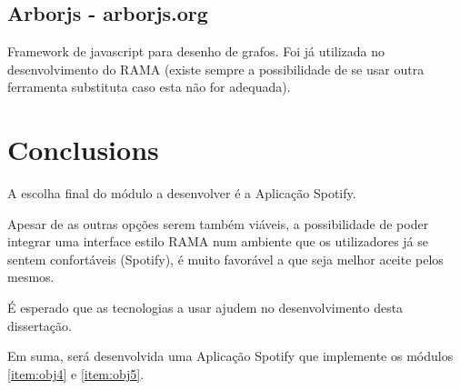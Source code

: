   \subsection{Arborjs - arborjs.org} %
  \label{sub:arborjs}
    Framework de javascript para desenho de grafos. Foi já utilizada no desenvolvimento do RAMA (existe sempre a possibilidade de se usar outra ferramenta substituta caso esta não for adequada).
  


\section{Conclusions}

  A escolha final do módulo a desenvolver é a Aplicação Spotify.

  Apesar de as outras opções serem também viáveis, a possibilidade de poder integrar uma interface estilo RAMA num ambiente que os utilizadores já se sentem confortáveis (Spotify), é muito favorável a que seja melhor aceite pelos mesmos.

  É esperado que as tecnologias a usar ajudem no desenvolvimento desta dissertação.

  Em suma, será desenvolvida uma Aplicação Spotify que implemente os módulos \ref{item:obj4} e \ref{item:obj5}.